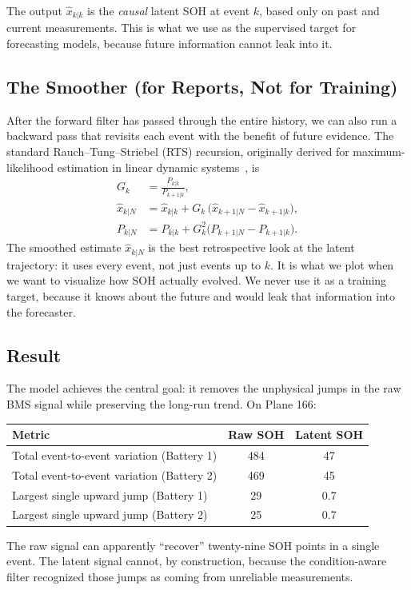 \documentclass[11pt]{article}
\begin{document}
The output \(\widehat{x}_{k|k}\) is the \emph{causal} latent SOH at
event \(k\), based only on past and current measurements. This is what
we use as the supervised target for forecasting models, because future
information cannot leak into it.

\subsection{The Smoother (for Reports, Not for Training)}

After the forward filter has passed through the entire history, we can
also run a backward pass that revisits each event with the benefit of
future evidence. The standard Rauch--Tung--Striebel (RTS) recursion,
originally derived for maximum-likelihood estimation in linear dynamic
systems~\cite{rauch1965rts}, is
\begin{align}
G_k &= \frac{P_{k|k}}{P_{k+1|k}}, \\
\widehat{x}_{k|N} &= \widehat{x}_{k|k} + G_k\,\big(\widehat{x}_{k+1|N} - \widehat{x}_{k+1|k}\big), \\
P_{k|N} &= P_{k|k} + G_k^{2}\big(P_{k+1|N} - P_{k+1|k}\big).
\end{align}
The smoothed estimate \(\widehat{x}_{k|N}\) is the best retrospective
look at the latent trajectory: it uses every event, not just events up
to \(k\). It is what we plot when we want to visualize how SOH actually
evolved. We never use it as a training target, because it knows about
the future and would leak that information into the forecaster.

\subsection{Result}

The model achieves the central goal: it removes the unphysical jumps in
the raw BMS signal while preserving the long-run trend. On Plane 166:
\begin{center}
\begin{tabular}{lcc}
\toprule
Metric & Raw SOH & Latent SOH \\
\midrule
Total event-to-event variation (Battery 1) & 484 & 47 \\
Total event-to-event variation (Battery 2) & 469 & 45 \\
Largest single upward jump (Battery 1) & 29 & 0.7 \\
Largest single upward jump (Battery 2) & 25 & 0.7 \\
\bottomrule
\end{tabular}
\end{center}
The raw signal can apparently ``recover'' twenty-nine SOH points in a
single event. The latent signal cannot, by construction, because the
condition-aware filter recognized those jumps as coming from
unreliable measurements.
\end{document}

